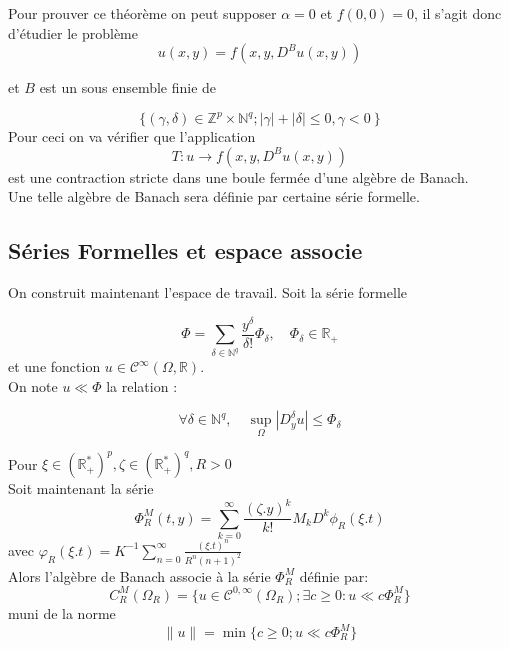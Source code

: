 \documentclass{beamer}
\newcommand{\Nq}{\ensuremath{\mathbb{N}^q}}
\newcommand{\ZpNq}{\ensuremath{\mathbb{Z}^p\times \mathbb{N}^q}}
\newcommand{\Mp}{\ensuremath{{\mathbb{R}}_+}}
\newcommand{\Mep}{\ensuremath{{\mathbb{R}}_+^*}}
\begin{document}
\begin{frame}
 Pour prouver ce théorème on peut supposer $ \alpha=0$ et $f(0,0)=0$, il s'agit donc d'étudier le problème 
 \begin{equation*}
 u(x,y)=f(x,y,D^Bu(x,y))
\end{equation*}

et $B$ est un sous ensemble finie de 

 $$\{ ( \gamma , \delta) \in \ZpNq ; |\gamma| +|\delta|\leq 0, \gamma < 0\  \}$$
 Pour ceci on va vérifier que l'application 
$$ T: u \rightarrow f(x,y,D^Bu(x,y))$$ 
est une contraction stricte dans une boule fermée d'une algèbre de Banach.\\
Une telle algèbre de Banach sera définie par certaine série formelle.

\end{frame}
\subsection{Séries Formelles et espace associe}

\begin{frame}
On construit maintenant l'espace de travail. Soit la série formelle 

$$ \Phi = \sum_{ \delta \in \Nq} \frac{y^\delta}{\delta !} \Phi_\delta, \quad \Phi_\delta \in \Mp$$
 et une fonction $ u \in \mathcal{C}^\infty ( \Omega, \mathbb{R})$.\\
 
 On note $ u \ll \Phi $ la relation :
  
  $$ \forall \delta \in \Nq , \quad \sup_\Omega | D^\delta _y u | \leq \Phi_\delta $$ 


\end{frame}

\begin{frame}
Pour $\xi \in (\Mep)^p,  \zeta \in (\Mep)^q , R>0$\\
Soit maintenant la série 
\begin{equation*}
\Phi_R^M(t,y)=\sum_{k=0}^\infty \frac{(\zeta.y)^k}{k!}M_kD^k\phi_R(\xi.t) 
\end{equation*} 
avec $ \varphi_R(\xi.t)= K^{-1}\sum_{n=0}^\infty  \frac{(\xi.t)^n}{R^n(n+1)^2}$\\
Alors l'algèbre de Banach associe à la série $\Phi_R^M$ définie par:  
$$C_R^M(\Omega_R)= \{ u \in   \mathcal{C}^{0,\infty} (\Omega_R ); \exists c \geq 0 : u \ll c \Phi_R^M \}$$  
muni de la norme 
$$ \|u\|= \min \{ c \geq 0 ; u \ll c \Phi_R^M \}$$
\end{frame}
\end{document}
